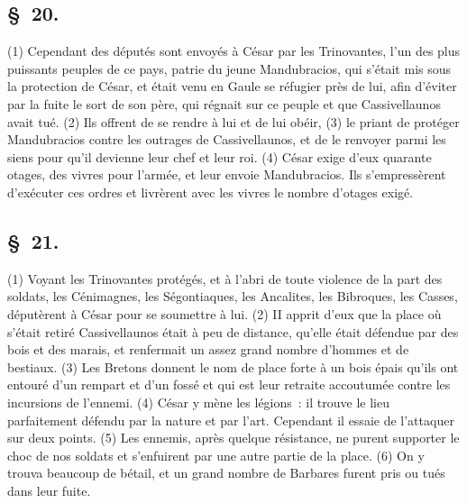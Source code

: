 \documentclass[french,twoside]{book} %
\begin{document}
\subsection[{§ 20.}]{ \textsc{§ 20.} }
\noindent (1) Cependant des députés sont envoyés à César par les Trinovantes, l’un des plus puissants peuples de ce pays, patrie du jeune Mandubracios, qui s’était mis sous la protection de César, et était venu en Gaule se réfugier près de lui, afin d’éviter par la fuite le sort de son père, qui régnait sur ce peuple et que Cassivellaunos avait tué. (2) Ils offrent de se rendre à lui et de lui obéir, (3) le priant de protéger Mandubracios contre les outrages de Cassivellaunos, et de le renvoyer parmi les siens pour qu’il devienne leur chef et leur roi. (4) César exige d’eux quarante otages, des vivres pour l’armée, et leur envoie Mandubracios. Ils s’empressèrent d’exécuter ces ordres et livrèrent avec les vivres le nombre d’otages exigé.
\subsection[{§ 21.}]{ \textsc{§ 21.} }
\noindent (1) Voyant les Trinovantes protégés, et à l’abri de toute violence de la part des soldats, les Cénimagnes, les Ségontiaques, les Ancalites, les Bibroques, les Casses, députèrent à César pour se soumettre à lui. (2) II apprit d’eux que la place où s’était retiré Cassivellaunos était à peu de distance, qu’elle était défendue par des bois et des marais, et renfermait un assez grand nombre d’hommes et de bestiaux. (3) Les Bretons donnent le nom de place forte à un bois épais qu’ils ont entouré d’un rempart et d’un fossé et qui est leur retraite accoutumée contre les incursions de l’ennemi. (4) César y mène les légions : il trouve le lieu parfaitement défendu par la nature et par l’art. Cependant il essaie de l’attaquer sur deux points. (5) Les ennemis, après quelque résistance, ne purent supporter le choc de nos soldats et s’enfuirent par une autre partie de la place. (6) On y trouva beaucoup de bétail, et un grand nombre de Barbares furent pris ou tués dans leur fuite.
\end{document}
